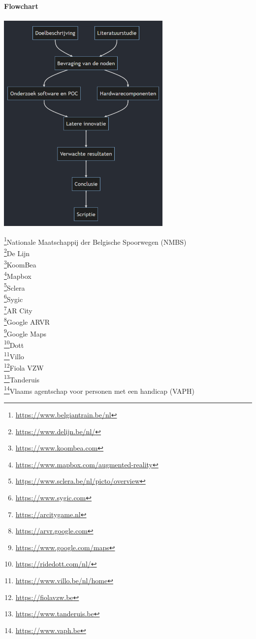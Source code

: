 \documentclass{hogent-article}
\begin{document}
    \textbf{Flowchart} \\\\
    \includegraphics[width=\columnwidth,height=11cm]{flow}
    
    
    \printbibliography[heading=bibintoc]
    
    \footnote{\url{https://www.belgiantrain.be/nl}}Nationale Maatschappij der Belgische Spoorwegen (NMBS) \\
    \footnote{\url{https://www.delijn.be/nl/}}De Lijn \\
    \footnote{\url{https://www.koombea.com}}KoomBea \\
    \footnote{\url{https://www.mapbox.com/augmented-reality}}Mapbox \\
    \footnote{\url{https://www.sclera.be/nl/picto/overview}}Sclera \\
    \footnote{\url{https://www.sygic.com}}Sygic \\
    \footnote{\url{https://arcitygame.nl}}AR City \\
    \footnote{\url{https://arvr.google.com}}Google ARVR \\
    \footnote{\url{https://www.google.com/maps}}Google Maps \\
    \footnote{\url{https://ridedott.com/nl/}}Dott \\
    \footnote{\url{https://www.villo.be/nl/home}}Villo \\
    \footnote{\url{ https://fiolavzw.be}}Fiola VZW \\
    \footnote{\url{https://www.tanderuis.be}}Tanderuis \\
    \footnote{\url{https://www.vaph.be}}Vlaams agentschap voor personen met een handicap (VAPH)\\
    
\end{document}
